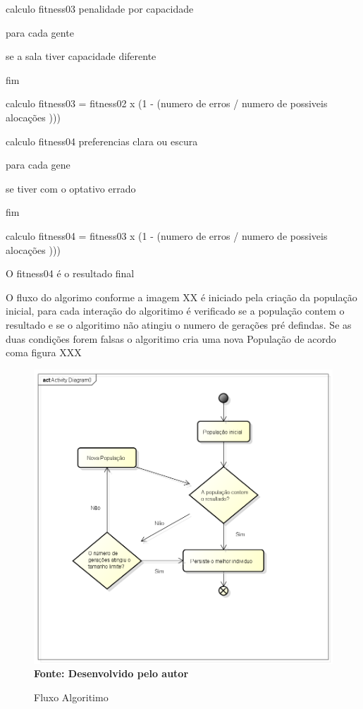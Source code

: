 \documentclass{abntpuc}
\begin{document}
calculo fitness03 penalidade por capacidade

para cada gente

se a sala tiver capacidade diferente

fim

calculo fitness03 = fitness02 x (1 - (numero de erros /  numero de possiveis alocações )))


calculo fitness04 preferencias clara ou escura

para cada gene 

se tiver com o optativo errado 

fim	

calculo fitness04 = fitness03 x (1 - (numero de erros /  numero de possiveis alocações )))


O fitness04 é o resultado final


O fluxo do algorimo conforme a imagem XX é iniciado pela criação da população inicial, para cada interação do algoritimo é verificado se a população contem o resultado e se o algoritimo não atingiu o numero de gerações pré defindas. Se as duas condições forem falsas o algoritimo cria uma nova População de acordo coma figura XXX

\begin{figure}[!htb]
\caption[Fluxo Algoritimo]{Fluxo Algoritimo}
\label{fig:figura8}
\centering
\includegraphics[scale=0.5]{imagens/fluxoAlgoritimo.png}
\\ \textbf{\footnotesize Fonte: Desenvolvido pelo autor}
\end{figure}

%

%
\end{document}
